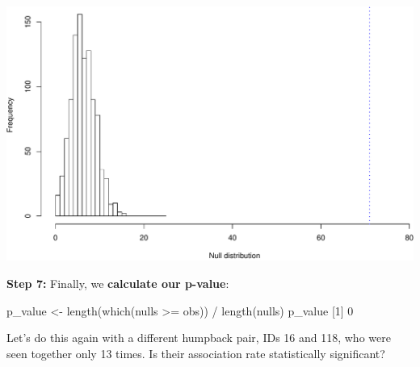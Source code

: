 \documentclass[
]{book}
\newenvironment{Shaded}{\begin{snugshade}}{\end{snugshade}}
\newcommand{\DecValTok}[1]{\textcolor[rgb]{0.00,0.00,0.81}{#1}}
\newcommand{\FunctionTok}[1]{\textcolor[rgb]{0.00,0.00,0.00}{#1}}
\newcommand{\NormalTok}[1]{#1}
\newcommand{\OtherTok}[1]{\textcolor[rgb]{0.56,0.35,0.01}{#1}}
\newcommand{\SpecialCharTok}[1]{\textcolor[rgb]{0.00,0.00,0.00}{#1}}
\begin{document}
\includegraphics{figures/unnamed-chunk-456-1.pdf}

\textbf{Step 7:} Finally, we \textbf{calculate our p-value}:

\begin{Shaded}
\begin{Highlighting}[]
\NormalTok{p\_value }\OtherTok{\textless{}{-}} \FunctionTok{length}\NormalTok{(}\FunctionTok{which}\NormalTok{(nulls }\SpecialCharTok{\textgreater{}=}\NormalTok{ obs)) }\SpecialCharTok{/} \FunctionTok{length}\NormalTok{(nulls)}
\NormalTok{p\_value}
\NormalTok{[}\DecValTok{1}\NormalTok{] }\DecValTok{0}
\end{Highlighting}
\end{Shaded}

Let's do this again with a different humpback pair, IDs 16 and 118, who were seen together only 13 times. Is their association rate statistically significant?
\end{document}
